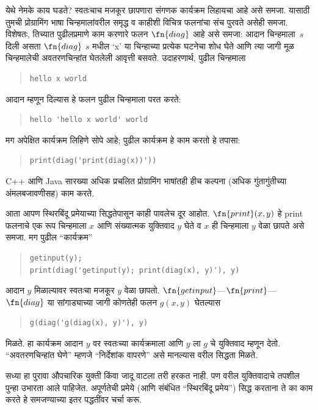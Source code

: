 \documentclass[../../../include/open-logic-section]{subfiles}
\begin{document}
\begin{explain}
येथे नेमके काय घडते? स्वतःचाच मजकूर छापणारा संगणक
कार्यक्रम लिहायचा आहे असे समजा. यासाठी तुमची प्रोग्रामिंग
भाषा चिन्हमालांवरील समृद्ध व काहीशी विचित्र फलनांचा संच
पुरवते असेही समजा. विशेषतः, तिच्यात पुढीलप्रमाणे काम करणारे
फलन $\fn{diag}$ आहे असे समजा: आदान चिन्हमाला~$s$
दिली असता $\fn{diag}$ $s$ मधील `x' या चिन्हाच्या प्रत्येक
घटनेचा शोध घेते आणि त्या जागी मूळ चिन्हमालेची अवतरणचिन्हांत
घेतलेली आवृत्ती बसवते. उदाहरणार्थ, पुढील चिन्हमाला
\begin{quote}
\begin{verbatim}
hello x world
\end{verbatim}
\end{quote}
आदान म्हणून दिल्यास हे फलन पुढील चिन्हमाला परत करते:
\begin{quote}
\begin{verbatim}
hello 'hello x world' world
\end{verbatim}
\end{quote}
मग अपेक्षित कार्यक्रम लिहिणे सोपे आहे; पुढील कार्यक्रम
हे काम करतो हे तपासा:
\begin{quote}
\begin{verbatim}
print(diag('print(diag(x))'))
\end{verbatim}
\end{quote}
C++ आणि Java सारख्या अधिक प्रचलित प्रोग्रामिंग भाषांतही
हीच कल्पना (अधिक गुंतागुंतीच्या अंमलबजावणीसह) काम करते.

आता आपण स्थिरबिंदू प्रमेयाच्या सिद्धतेपासून काही पावलेच
दूर आहोत. $\fn{print}(x,y)$ हे print फलनाचे एक रूप
चिन्हमाला $x$ आणि संख्यात्मक युक्तिवाद $y$ घेते व
$x$ ही चिन्हमाला $y$ वेळा छापते असे समजा. मग पुढील ``कार्यक्रम''
\begin{quote}
\begin{verbatim}
getinput(y);
print(diag('getinput(y); print(diag(x), y)'), y)
\end{verbatim}
\end{quote}
आदान $y$ मिळाल्यावर स्वतःचा मजकूर $y$ वेळा छापतो.
$\fn{getinput}$---$\fn{print}$---$\fn{diag}$ या सांगाड्याच्या
जागी कोणतेही फलन $g(x,y)$ घेतल्यास
\begin{quote}
\begin{verbatim}
g(diag('g(diag(x), y)'), y)
\end{verbatim}
\end{quote}
मिळते. हा कार्यक्रम आदान $y$ वर स्वतःच्या कार्यक्रमाला
आणि $y$ ला $g$ चे युक्तिवाद म्हणून देतो. ``अवतरणचिन्हांत
घेणे'' म्हणजे ``निर्देशांक वापरणे'' असे मानल्यास वरील
सिद्धता मिळते.

सध्या हा पुरावा औपचारिक युक्ती किंवा जादू वाटला तरी
हरकत नाही. पण वरील युक्तिवादाचे तपशील पुन्हा उभारता
आले पाहिजेत. अपूर्णतेची प्रमेये (आणि संबंधित ``स्थिरबिंदू
प्रमेय'') सिद्ध करताना ते का काम करते हे समजण्याच्या
इतर पद्धतींवर चर्चा करू.
\end{explain}
\end{document}
